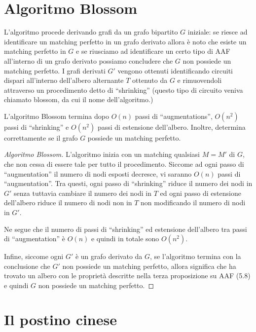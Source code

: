 \documentclass[\main/main.tex]{subfiles}
\begin{document}
\section{Algoritmo Blossom}
L'algoritmo procede derivando grafi da un grafo bipartito \(G\) iniziale: se riesce ad identificare un matching perfetto in un grafo derivato allora è noto che esiste un matching perfetto in \(G\) e se riusciamo ad identificare un certo tipo di AAF all'interno di un grafo derivato possiamo concludere che \(G\) non possiede un matching perfetto. I grafi derivati \(G'\) vengono ottenuti identificando circuiti dispari all'interno dell'albero alternante \(T\) ottenuto da \(G\) e rimuovendoli attraverso un procedimento detto di ``shrinking'' (questo tipo di circuito veniva chiamato blossom, da cui il nome dell'algoritmo.)

\begin{theorem}
  L'algoritmo Blossom termina dopo \(O(n)\) passi di ``augmentations'', \(O(n^2)\) passi di ``shrinking'' e \(O(n^2)\) passi di estensione dell'albero. Inoltre, determina correttamente se il grafo \(G\) possiede un matching perfetto.
\end{theorem}
\begin{proof}[Algoritmo Blossom]
  L'algoritmo inizia con un matching qualsiasi \(M=M'\) di \(G\), che non cessa di essere tale per tutto il procedimento. Siccome ad ogni passo di ``augmentation'' il numero di nodi esposti decresce, vi saranno \(O(n)\) passi di ``augmentation''. Tra questi, ogni passo di ``shrinking'' riduce il numero dei nodi in \(G'\) senza tuttavia cambiare il numero dei nodi in \(T\) ed ogni passo di estensione dell'albero riduce il numero di nodi non in \(T\) non modificando il numero di nodi in \(G'\).

  Ne segue che il numero di passi di ``shrinking'' ed estensione dell'albero tra passi di ``augmentation'' è \(O(n)\) e quindi in totale sono \(O(n^2)\).

  Infine, siccome ogni \(G'\) è un grafo derivato da \(G\), se l'algoritmo termina con la conclusione che \(G'\) non possiede un matching perfetto, allora significa che ha trovato un albero con le proprietà descritte nella terza proposizione su AAF (5.8) e quindi \(G\) non possiede un matching perfetto.
\end{proof}

\section{Il postino cinese}
\end{document}
